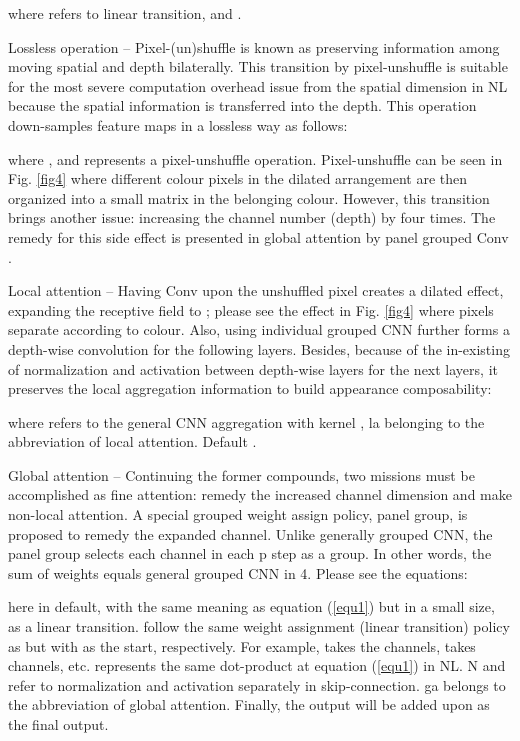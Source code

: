 \documentclass{article}
\begin{document}
where  refers to linear transition, and . 

Lossless operation – Pixel-(un)shuffle is known as preserving information among moving spatial and depth bilaterally. This transition by pixel-unshuffle is suitable for the most severe computation overhead issue from the spatial dimension in NL because the spatial information is transferred into the depth. This operation down-samples feature maps in a lossless way as follows:
\useshortskip

where  , and  represents a pixel-unshuffle operation. Pixel-unshuffle can be seen in Fig. \ref{fig4} where different colour pixels in the dilated arrangement are then organized into a small matrix in the belonging colour. However, this transition brings another issue: increasing the channel number (depth) by four times. The remedy for this side effect is presented in global attention by panel grouped Conv .

Local attention – Having  Conv upon the unshuffled pixel creates a dilated effect, expanding the receptive field to  ; please see the effect in Fig. \ref{fig4} where pixels separate according to colour. Also, using individual grouped CNN further forms a depth-wise convolution for the following layers. Besides, because of the in-existing of normalization and activation between depth-wise layers for the next layers, it preserves the local aggregation information to build appearance composability:
\useshortskip

where  refers to the general CNN aggregation with kernel , la belonging to the abbreviation of local attention. Default . 

Global attention – Continuing the former compounds, two missions must be accomplished as fine attention: remedy the increased channel dimension and make non-local attention. A special grouped weight assign policy, panel group, is proposed to remedy the expanded channel. Unlike generally grouped CNN, the panel group selects each channel in each p step as a group. In other words, the sum of weights equals general grouped CNN in 4. Please see the equations:
\useshortskip

\useshortskip

\useshortskip

here  in default,  with the same meaning as equation (\ref{equ1}) but in a small size,  as a linear transition.  follow the same weight assignment (linear transition) policy as  but with  as the start, respectively. For example,  takes the  channels,  takes  channels, etc.   represents the same dot-product at equation (\ref{equ1}) in NL. N and  refer to normalization and activation separately in skip-connection. ga belongs to the abbreviation of global attention. Finally, the output will be added upon  as the final output.
\end{document}
